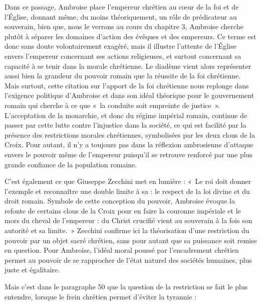 \bigskip

Dans ce passage, Ambroise place l'empereur chrétien au cœur de la foi et de l'Église, donnant même, du moins théoriquement, un rôle de prédicateur au souverain, bien que, nous le verrons au cours du chapitre 3, Ambroise cherche plutôt à séparer les domaines d'action des évêques et des empereurs. Ce terme est donc sans doute volontairement exagéré, mais il illustre l'attente de l'Église envers l'empereur concernant ses actions religieuses, et surtout concernant sa capacité à se tenir dans la morale chrétienne. Le diadème vient alors représenter aussi bien la grandeur du pouvoir romain que la réussite de la foi chrétienne. Mais surtout, cette citation sur l'apport de la foi chrétienne nous replonge dans l'exigence politique d'Ambroise et dans son idéal théorique pour le gouvernement romain qui cherche à ce que «~la conduite soit empreinte de justice~». L'acceptation de la monarchie, et donc du régime impérial romain, continue de passer par cette lutte contre l'injustice dans la société, ce qui est facilité par la présence des restrictions morales chrétiennes, symbolisées par les deux clous de la Croix. Pour autant, il n'y a toujours pas dans la réflexion ambrosienne d'attaque envers le pouvoir même de l'empereur puisqu'il se retrouve renforcé par une plus grande confiance de la population romaine.

\bigskip

C'est également ce que Giuseppe Zecchini met en lumière : «~Le roi doit donner l’exemple et reconnaître une double limite à sa  : le respect de la loi divine et du droit romain. Symbole de cette conception du pouvoir, Ambroise évoque la refonte de certains clous de la Croix pour en faire la couronne impériale et le mors du cheval de l’empereur : du Christ crucifié vient au souverain à la fois son autorité et sa limite\autocite[165]{zecchini_pensiero_politico}.~» Zecchini confirme ici la théorisation d'une restriction du pouvoir par un objet sacré chrétien, sans pour autant que sa puissance soit remise en question. Pour Ambroise, l'idéal moral poussé par l'encadrement chrétien permet au pouvoir de se rapprocher de l'état naturel des sociétés humaines, plus juste et égalitaire.

\bigskip

Mais c'est dans le paragraphe 50 que la question de la restriction se fait le plus entendre, lorsque le frein chrétien permet d'éviter la tyrannie :

\bigskip

